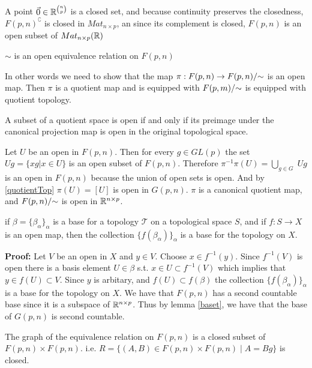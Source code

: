 \documentclass[11pt,a4paper]{report}
\begin{document}
A point $ \vec{0} \in \mathbb{R}^{n \choose p}$ is a closed set, and because continuity preserves the closedness, $F(p,n)^\complement$ is closed in $Mat_{n \times p}$,
an since its complement is closed, $F(p,n)$ is an open subset of $Mat_{n \times p}(\mathbb{R})$
\begin{Prop}
    $\sim$ is an open equivalence relation on $F(p,n)$
\end{Prop}
In other words we need to show that the map $\pi: F(p,n) \to F(p,n)/{\sim}$ is an open map.
Then $\pi$ is a quotient map and is equipped with $F(p,m)/{\sim}$ is equipped with quotient topology.
\newline
\begin{Lemma} \label{quotientTop}
    A subset of a quotient space is open if and only if its
    preimage under the canonical projection map is open in the original topological space.
\end{Lemma}
Let $U$ be an open in $F(p,n)$. Then for every $g \in GL(p)$ the set $U g = \{ x g | x \in U \}$ is an open subset of $F(p,n)$.
Therefore $\pi^{-1}\pi(U) = \displaystyle \bigcup_{g \in G} \; U g$ is an open in $F(p,n)$ because the union of open sets is open.
And by \ref{quotientTop} $\pi(U) = [U]$ is open in $G(p,n)$. $\pi$ is a canonical quotient map, and $F(p,n)/{\sim}$ is open in $\mathbb{R}^{n \times p}$. 
\begin{Lemma}
    \label{baset}
    if $\beta = \{ \beta_\alpha \}_\alpha$ is a base for a topology $\mathcal{T}$ on a topological space $S$,
    and if $f: S \to X$ is an open map, then the collection $\{ f (\beta_\alpha) \}_\alpha$ is a base for the topology on $X$.
\end{Lemma}
\textbf{Proof:} Let $V$ be an open in $X$ and $y \in V$. Choose $x \in f^{-1}(y)$. 
Since $f^{-1} (V)$ is open there is a basis element $U \in \beta$ s.t. $x \in U \subset f^{-1}(V)$
which implies that $y \in f(U) \subset V$. Since $y$ is arbitary, and $f(U) \subset f(\beta)$ the collection $\{ f (\beta_\alpha) \}_\alpha$ is a base for the topology on $X$.
\newline
\newline
We have that $F(p,n)$ has a second countable base since it is a subspace of $\mathbb{R}^{n \times p}$.
Thus by lemma \ref{baset}, we have that the base of $G(p,n)$ is second countable.
\begin{Prop}
The graph of the equivalence relation on $F(p,n)$ is a closed subset of $F(p,n) \times F(p,n)$. i.e. $ R = \{ (A,B) \in F(p,n) \times F(p,n) \; | \; A = Bg \}$ is closed.
\end{Prop}
\end{document}
